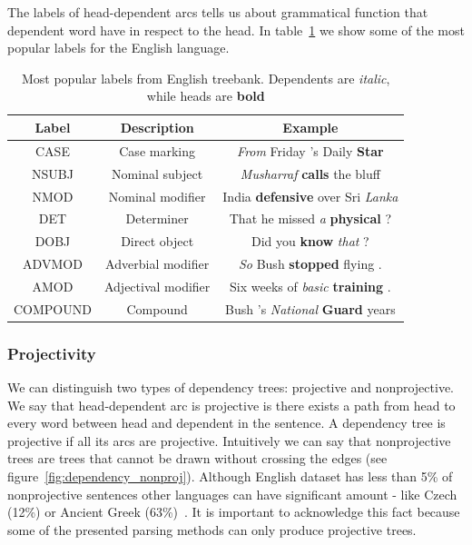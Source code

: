 The labels of head-dependent arcs tells us about grammatical function that
dependent word have in respect to the head. In table~\ref{tab:label_samples}
we show some of the most popular labels for the English language.

\begin{table}[!htbp]
    \centering
    \begin{tabular}{c | c | c}
        Label & Description & Example \\ \hline\hline
        CASE & Case marking & \textit{From} Friday 's Daily \textbf{Star} \\
        NSUBJ & Nominal subject & \textit{Musharraf} \textbf{calls} the bluff \\
        NMOD & Nominal modifier & India \textbf{defensive} over Sri \textit{Lanka} \\
        DET & Determiner & That he missed \textit{a} \textbf{physical} ? \\
        DOBJ & Direct object & Did you \textbf{know} \textit{that} ? \\
        ADVMOD & Adverbial modifier & \textit{So} Bush \textbf{stopped} flying . \\
        AMOD & Adjectival modifier & Six weeks of \textit{basic} \textbf{training} . \\
        COMPOUND & Compound & Bush 's \textit{National} \textbf{Guard} years
    \end{tabular}
    \caption{Most popular labels from English treebank. Dependents are \textit{italic},
    while heads are \textbf{bold}}
    \label{tab:label_samples}
\end{table}

\subsubsection{Projectivity}
We can distinguish two types of dependency trees: projective and nonprojective.
We say that head-dependent arc is projective is there exists a path from head
to every word between head and dependent in the sentence. A dependency tree is
projective if all its arcs are projective.
Intuitively we can say that nonprojective trees are trees that cannot be drawn
without crossing the edges (see figure~\ref{fig:dependency_nonproj}).
Although English dataset has less than 5\% of nonprojective sentences other
languages can have significant amount - like Czech (12\%) or Ancient Greek (63\%)~\cite{straka_parsing_2015}.
It is important to acknowledge this fact because some of the presented parsing
methods can only produce projective trees.

